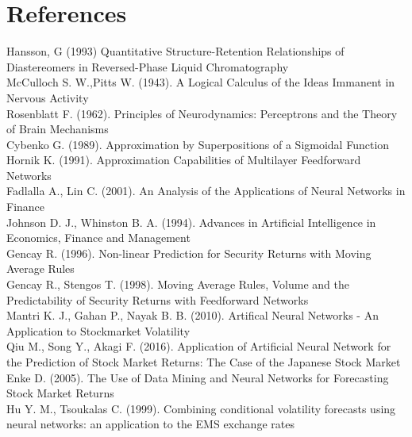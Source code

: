 \documentclass[12pt, letterpaper]{amsart}%
\begin{document}
\newpage

\section{References}
Hansson, G (1993) Quantitative Structure-Retention Relationships of Diastereomers in Reversed-Phase Liquid Chromatography
\\

McCulloch S. W.,Pitts W. (1943). A Logical Calculus of the Ideas Immanent in Nervous Activity
\\

Rosenblatt F. (1962). Principles of Neurodynamics: Perceptrons and the Theory of Brain Mechanisms
\\

Cybenko G. (1989). Approximation by Superpositions of a Sigmoidal Function
\\

Hornik K. (1991). Approximation Capabilities of Multilayer Feedforward Networks
\\



Fadlalla A., Lin C. (2001). An Analysis of the Applications of Neural Networks in Finance
\\

Johnson D. J., Whinston B. A. (1994). Advances in Artificial Intelligence in Economics, Finance and Management
\\




Gencay R. (1996). Non-linear Prediction for Security Returns with Moving Average Rules
\\

Gencay R., Stengos T. (1998). Moving Average Rules, Volume and the Predictability of Security Returns with Feedforward Networks
\\

Mantri K. J., Gahan P., Nayak B. B. (2010). Artifical Neural Networks - An Application to Stockmarket Volatility
\\

Qiu M., Song Y., Akagi F. (2016). Application of Artificial Neural Network for the Prediction of Stock Market Returns: The Case of the Japanese Stock Market
\\

Enke D. (2005). The Use of Data Mining and Neural Networks for Forecasting Stock Market Returns
\\

Hu Y. M., Tsoukalas C. (1999). Combining conditional volatility forecasts using neural networks: an application to the EMS exchange rates
\\
\end{document}
